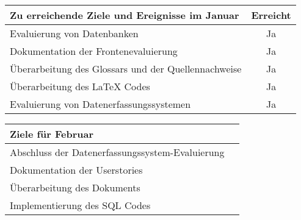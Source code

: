 \begin{tabularx}{\textwidth}{Xc}
    \arrayrulecolor{OliveGreen}
    \toprule
    {\bfseries Zu erreichende Ziele und Ereignisse im Januar} & {\bfseries Erreicht} \\
    \midrule[2pt]
    Evaluierung von Datenbanken                                 &Ja                    \\
    \rowcolor{OliveGreen!15}
    Dokumentation der Frontenevaluierung                        &Ja                    \\
    \rowcolor{White}
    Überarbeitung des Glossars und der Quellennachweise         &Ja                    \\
    \rowcolor{OliveGreen!15}
    Überarbeitung des \LaTeX{} Codes                            &Ja                    \\
    \rowcolor{White}
    Evaluierung von Datenerfassungssystemen                     &Ja                    \\
    \bottomrule[2pt]
\end{tabularx}
%
\vspace{1cm}
%
\begin{tabularx}{\textwidth}{Xc}
    \arrayrulecolor{OliveGreen}
    \toprule
    {\bfseries Ziele für Februar}                         &                      \\
    \midrule[2pt]
    Abschluss der Datenerfassungssystem\hyp{}Evaluierung &                      \\
    \rowcolor{OliveGreen!15}
    Dokumentation der Userstories                       &                      \\
    \rowcolor{White}
    Überarbeitung des Dokuments                         &                      \\
    \rowcolor{OliveGreen!15}
    Implementierung des SQL Codes                     &                      \\
\end{tabularx}
